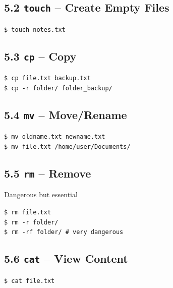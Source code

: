\documentclass[12pt]{article}
\begin{document}
\subsection*{5.2 \texttt{touch} – Create Empty Files}

\begin{highlightbox}
\texttt{\$ touch notes.txt}
\end{highlightbox}

\subsection*{5.3 \texttt{cp} – Copy}

\begin{highlightbox}
\texttt{\$ cp file.txt backup.txt}\\
\texttt{\$ cp -r folder/ folder\_backup/}
\end{highlightbox}

\subsection*{5.4 \texttt{mv} – Move/Rename}

\begin{highlightbox}
\texttt{\$ mv oldname.txt newname.txt}\\
\texttt{\$ mv file.txt /home/user/Documents/}
\end{highlightbox}

\subsection*{5.5 \texttt{rm} – Remove}

\begin{warningbox}
  Dangerous but essential
\end{warningbox}

\begin{highlightbox}
\texttt{\$ rm file.txt}\\
\texttt{\$ rm -r folder/}\\
\texttt{\$ rm -rf folder/  \# very dangerous}
\end{highlightbox}

\subsection*{5.6 \texttt{cat} – View Content}

\begin{highlightbox}
\texttt{\$ cat file.txt}
\end{highlightbox}
\end{document}
